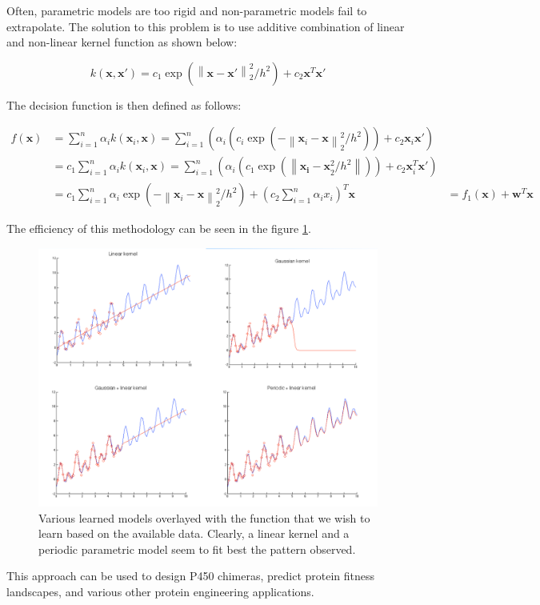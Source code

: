 \documentclass[a4paper,10pt,twoside]{article}
\newcommand\norm[1]{\left\lVert#1\right\rVert}
\begin{document}
Often, parametric models are too rigid and non-parametric models fail to extrapolate. The solution to this problem is to use additive combination of linear and non-linear kernel function as shown below:

\begin{equation*}
    k(\mathbf{x}, \mathbf{x}') = c_1\exp\left(\norm{\mathbf{x} - \mathbf{x}'}_2^2/h^2\right) + c_2\mathbf{x}^T\mathbf{x}'
\end{equation*}

The decision function is then defined as follows:

\begin{align*}
    f(\mathbf{x}) &= \sum_{i=1}^{n}\alpha_i k(\mathbf{x}_i, \mathbf{x})=\sum_{i=1}^{n}\left(\alpha_i(c_i \exp(-\norm{\mathbf{x}_i-\mathbf{x}}_2^2/h^2))+c_2\mathbf{x}_i\mathbf{x}'\right)\\
    &= c_1 \sum_{i=1}^{n}\alpha_i k(\mathbf{x}_i,\mathbf{x}) = \sum_{i=1}^{n}\left(\alpha_i(c_1\exp\left(\norm{\mathbf{x_i-\mathbf{x}}_2^2/h^2}\right))+c_2\mathbf{x}_i^T\mathbf{x}'\right)\\
    &= c_1\sum_{i=1}^{n}\alpha_i\exp\left(-\norm{\mathbf{x}_i-\mathbf{x}}_2^2/h^2\right) + \left(c_2\sum_{i=1}^{n}\alpha_ix_i\right)^T\mathbf{x}
    &= f_1(\mathbf{x})+\mathbf{w}^T\mathbf{x}
\end{align*}

The efficiency of this methodology can be seen in the figure \ref{semiparametricregression}.

\begin{figure}[htbp]
    \centering
    \includegraphics[width=.5\textwidth]{figures/semi-parametric-regression.png}
    \caption{Various learned models overlayed with the function that we wish to learn based on the available data. Clearly, a linear kernel and a periodic parametric model seem to fit best the pattern observed.}
    \label{semiparametricregression}
\end{figure}

This approach can be used to design P450 chimeras, predict protein fitness landscapes, and various other protein engineering applications.
\end{document}
